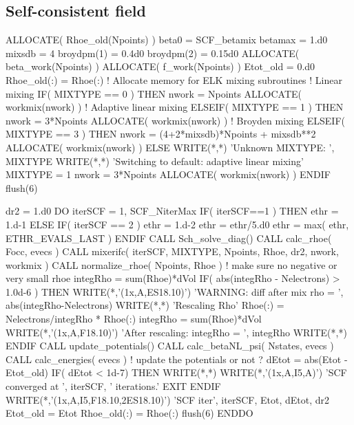\subsection{Self-consistent field}

\begin{fortrancode}
ALLOCATE( Rhoe_old(Npoints) )
beta0 = SCF_betamix
betamax = 1.d0
mixsdb = 4
broydpm(1) = 0.4d0
broydpm(2) = 0.15d0
ALLOCATE( beta_work(Npoints) )
ALLOCATE( f_work(Npoints) )
Etot_old = 0.d0
Rhoe_old(:) = Rhoe(:)
! Allocate memory for ELK mixing subroutines
! Linear mixing
IF( MIXTYPE == 0 ) THEN 
  nwork = Npoints
  ALLOCATE( workmix(nwork) )
! Adaptive linear mixing
ELSEIF( MIXTYPE == 1 ) THEN 
  nwork = 3*Npoints
  ALLOCATE( workmix(nwork) )
! Broyden mixing
ELSEIF( MIXTYPE == 3 ) THEN 
  nwork = (4+2*mixsdb)*Npoints + mixsdb**2
  ALLOCATE( workmix(nwork) )
ELSE 
  WRITE(*,*) 'Unknown MIXTYPE: ', MIXTYPE
  WRITE(*,*) 'Switching to default: adaptive linear mixing'
  MIXTYPE = 1
  nwork = 3*Npoints
  ALLOCATE( workmix(nwork) )
ENDIF 
flush(6)

dr2 = 1.d0
DO iterSCF = 1, SCF_NiterMax
   IF( iterSCF==1 ) THEN
    ethr = 1.d-1
  ELSE 
    IF( iterSCF == 2 ) ethr = 1.d-2
    ethr = ethr/5.d0
    ethr = max( ethr, ETHR_EVALS_LAST )
  ENDIF 
  CALL Sch_solve_diag()
  CALL calc_rhoe( Focc, evecs )
  CALL mixerifc( iterSCF, MIXTYPE, Npoints, Rhoe, dr2, nwork, workmix )
  CALL normalize_rhoe( Npoints, Rhoe )  ! make sure no negative or very small rhoe
  integRho = sum(Rhoe)*dVol
  IF( abs(integRho - Nelectrons) > 1.0d-6 ) THEN
    WRITE(*,'(1x,A,ES18.10)') 'WARNING: diff after mix rho = ', abs(integRho-Nelectrons)
    WRITE(*,*) 'Rescaling Rho'
    Rhoe(:) = Nelectrons/integRho * Rhoe(:)
    integRho = sum(Rhoe)*dVol
    WRITE(*,'(1x,A,F18.10)') 'After rescaling: integRho = ', integRho
    WRITE(*,*)
  ENDIF 
  CALL update_potentials()
  CALL calc_betaNL_psi( Nstates, evecs )
  CALL calc_energies( evecs ) ! update the potentials or not ?
  dEtot = abs(Etot - Etot_old)
  IF( dEtot < 1d-7) THEN 
    WRITE(*,*)
    WRITE(*,'(1x,A,I5,A)') 'SCF converged at ', iterSCF, ' iterations.'
    EXIT 
  ENDIF 
  WRITE(*,'(1x,A,I5,F18.10,2ES18.10)') 'SCF iter', iterSCF, Etot, dEtot, dr2
  Etot_old = Etot
  Rhoe_old(:) = Rhoe(:)
  flush(6)
ENDDO
\end{fortrancode}


